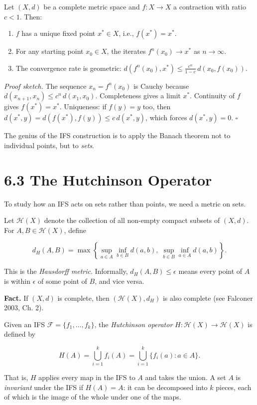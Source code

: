 \begin{theorem}
Let $(X, d)$ be a complete metric space and $f : X \to X$ a contraction with ratio $c < 1$. Then:
\end{theorem}

\begin{enumerate}
  \item $f$ has a unique fixed point $x^* \in X$, i.e., $f(x^*) = x^*$.
  \item For any starting point $x_0 \in X$, the iterates $f^n(x_0) \to x^*$ as $n \to \infty$.
  \item The convergence rate is geometric: $d(f^n(x_0), x^*) \le \frac{c^n}{1 - c} \, d(x_0, f(x_0))$.
\end{enumerate}

\textit{Proof sketch.} The sequence $x_n = f^n(x_0)$ is Cauchy because $d(x_{n+1}, x_n) \le c^n \, d(x_1, x_0)$. Completeness gives a limit $x^*$. Continuity of $f$ gives $f(x^*) = x^*$. Uniqueness: if $f(y) = y$ too, then $d(x^*, y) = d(f(x^*), f(y)) \le c \, d(x^*, y)$, which forces $d(x^*, y) = 0$. $\square$

The genius of the IFS construction is to apply the Banach theorem not to individual points, but to \textit{sets}.

\section{6.3 The Hutchinson Operator}

To study how an IFS acts on sets rather than points, we need a metric on sets.

\begin{definition}
Let $\mathcal{H}(X)$ denote the collection of all non-empty compact subsets of $(X, d)$. For $A, B \in \mathcal{H}(X)$, define

\[
d_H(A, B) = \max\left\{ \sup_{a \in A} \inf_{b \in B} d(a, b),\; \sup_{b \in B} \inf_{a \in A} d(a, b)\right\} .
\]

This is the \textit{Hausdorff metric}. Informally, $d_H(A, B) \le \epsilon$ means every point of $A$ is within $\epsilon$ of some point of $B$, and vice versa.

\textbf{Fact.} If $(X, d)$ is complete, then $(\mathcal{H}(X), d_H)$ is also complete (see Falconer 2003, Ch. 2).
\end{definition}

\begin{definition}
Given an IFS $\mathcal{F} = \{ f_1, \ldots, f_k\} $, the \textit{Hutchinson operator} $H : \mathcal{H}(X) \to \mathcal{H}(X)$ is defined by

\[
H(A) = \bigcup_{i=1}^{k} f_i(A) = \bigcup_{i=1}^{k} \{ f_i(a) : a \in A\} .
\]

That is, $H$ applies every map in the IFS to $A$ and takes the union. A set $A$ is \textit{invariant} under the IFS if $H(A) = A$: it can be decomposed into $k$ pieces, each of which is the image of the whole under one of the maps.
\end{definition}

